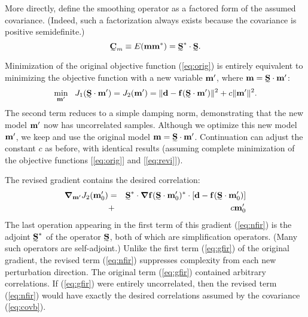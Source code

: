 \documentclass[12pt]{article}
\begin{document}
More directly, define the smoothing operator 
as a factored form of the assumed covariance.
(Indeed, such a factorization always exists because 
the covariance is positive semidefinite.)
\begin{equation}
\label{eq:covb}
\stensor{C}_m \equiv E(\svector{m} \svector{m}^* )
= \stensor{S}^* \cdot \stensor{S} .
\end{equation}

Minimization of the original objective function
(\ref{eq:orig}) is entirely equivalent to minimizing
the objective function with a new variable ${\mbox{\boldmath $\bf m$}}'$, 
where $\svector{m} = \stensor{S} \cdot \svector{m}'$:
\begin{equation}
\label{eq:revi}
\min_{\svector{\scriptstyle m}'} ~~
J_1 ( \stensor{S} \cdot \svector{m}' )=
J_2 ( \svector{m}' )=
\| \svector{d} - \svector{f}(\stensor{S} \cdot \svector{m}') \|^2 
+ c \| \svector{m}' \|^2 .
\end{equation}
The second term reduces to a simple damping norm,
demonstrating that the new model ${\mbox{\boldmath $\bf m$}}'$ now
has uncorrelated samples.
Although we optimize this new model ${\mbox{\boldmath $\bf m$}}'$,
we keep and use the original
model $\svector{m} = \stensor{S} \cdot \svector{m}'$.
Continuation can adjust the constant $c$ as before,
with identical results (assuming complete minimization
of the objective functions [\ref{eq:orig}] and [\ref{eq:revi}]).

The revised gradient contains the desired correlation:
\begin{eqnarray}
\label{eq:nfir}
\svector{\nabla}_{\svector{\scriptstyle m}'} J_2 (\svector{m}'_0 ) &=& 
\stensor{S}^* \cdot
\svector{\nabla} \svector{f} 
( \stensor{S} \cdot \svector{m}'_0 )^*
\cdot [ \svector{d} - \svector{f}( \stensor{S} \cdot \svector{m}'_0 ) ] 
\\
\label{eq:nsec}
&+& c  \svector{m}'_0
\end{eqnarray}
The last operation appearing in the first term of this
gradient (\ref{eq:nfir}) is the adjoint $\stensor{S}^*$
of the operator $\stensor{S}$, both of which are
simplification operators.
(Many such operators are self-adjoint.)
Unlike the first term (\ref{eq:gfir}) of the original gradient, 
the revised term (\ref{eq:nfir}) suppresses complexity
from each new perturbation direction.
The original term (\ref{eq:gfir}) 
contained arbitrary correlations.  If (\ref{eq:gfir}) 
were entirely uncorrelated, then the revised
term (\ref{eq:nfir}) would have exactly the desired correlations
assumed by the covariance (\ref{eq:covb}).  
\end{document}
